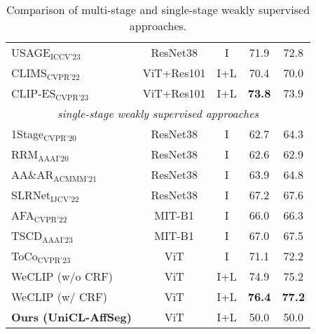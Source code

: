 \begin{table}[htbp]
\begin{tabular}{l c c c c}
        USAGE$_{\text{ICCV'23}}$~\cite{wsss_usage}    & ResNet38   & I    & 71.9          & 72.8          \\
        CLIMS$_{\text{CVPR'22}}$~\cite{wsss_clims}    & ViT+Res101 & I+L  & 70.4          & 70.0          \\
        CLIP-ES$_{\text{CVPR'23}}$~\cite{wsss_clip_es}                       & ViT+Res101 & I+L  & \textbf{73.8} & 73.9          \\
        \hline
        \multicolumn{5}{c}{\textit{single-stage weakly supervised approaches}}                                                   \\
        1Stage$_{\text{CVPR'20}}$~\cite{wsss_single_stage}                   & ResNet38   & I    & 62.7          & 64.3          \\
        RRM$_{\text{AAAI'20}}$~\cite{wsss_reliability_does_matter}           & ResNet38   & I    & 62.6          & 62.9          \\
        AA\&AR$_{\text{ACMMM'21}}$~\cite{wsss_aaar}                                 & ResNet38   & I    & 63.9          & 64.8          \\
        SLRNet$_{\text{IJCV'22}}$~\cite{wsss_slr_net}                                  & ResNet38   & I    & 67.2          & 67.6          \\
        AFA$_{\text{CVPR'22}}$~\cite{wsss_afa_affinity_from_attention}                                     & MIT-B1     & I    & 66.0          & 66.3          \\
        TSCD$_{\text{AAAI'23}}$~\cite{wsss_tscd}                                    & MIT-B1     & I    & 67.0          & 67.5          \\
        ToCo$_{\text{CVPR'23}}$~\cite{wsss_toco_token_contrast}                                    & ViT        & I    & 71.1          & 72.2          \\
        WeCLIP (w/o CRF)                                                & ViT        & I+L  & 74.9          & 75.2          \\
        WeCLIP (w/ CRF)                                                 & ViT        & I+L  & \textbf{76.4} & \textbf{77.2} \\
        \hline
        \textbf{Ours (UniCL-AffSeg)} & ViT & I+L & 50.0 & 50.0 \\
        \hline
    \end{tabular}
    \caption{Comparison of multi-stage and single-stage weakly supervised approaches.}
    \label{tab:quantitative_results}
\end{table}


